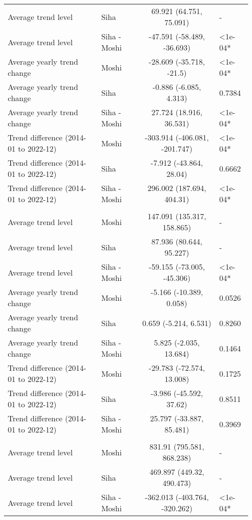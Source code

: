 \begin{longtable}{l|lcl}
Average trend level & Siha & 69.921 (64.751, 75.091) & - \\ 
Average trend level & Siha - Moshi & -47.591 (-58.489, -36.693) & <1e-04* \\ 
Average yearly trend change & Moshi & -28.609 (-35.718, -21.5) & <1e-04* \\ 
Average yearly trend change & Siha & -0.886 (-6.085, 4.313) & 0.7384 \\ 
Average yearly trend change & Siha - Moshi & 27.724 (18.916, 36.531) & <1e-04* \\ 
Trend difference (2014-01 to 2022-12) & Moshi & -303.914 (-406.081, -201.747) & <1e-04* \\ 
Trend difference (2014-01 to 2022-12) & Siha & -7.912 (-43.864, 28.04) & 0.6662 \\ 
Trend difference (2014-01 to 2022-12) & Siha - Moshi & 296.002 (187.694, 404.31) & <1e-04* \\ 
\midrule\addlinespace[2.5pt]
\multicolumn{4}{l}{Fractures} \\ 
\midrule\addlinespace[2.5pt]
Average trend level & Moshi & 147.091 (135.317, 158.865) & - \\ 
Average trend level & Siha & 87.936 (80.644, 95.227) & - \\ 
Average trend level & Siha - Moshi & -59.155 (-73.005, -45.306) & <1e-04* \\ 
Average yearly trend change & Moshi & -5.166 (-10.389, 0.058) & 0.0526 \\ 
Average yearly trend change & Siha & 0.659 (-5.214, 6.531) & 0.8260 \\ 
Average yearly trend change & Siha - Moshi & 5.825 (-2.035, 13.684) & 0.1464 \\ 
Trend difference (2014-01 to 2022-12) & Moshi & -29.783 (-72.574, 13.008) & 0.1725 \\ 
Trend difference (2014-01 to 2022-12) & Siha & -3.986 (-45.592, 37.62) & 0.8511 \\ 
Trend difference (2014-01 to 2022-12) & Siha - Moshi & 25.797 (-33.887, 85.481) & 0.3969 \\ 
\midrule\addlinespace[2.5pt]
\multicolumn{4}{l}{Hypertension} \\ 
\midrule\addlinespace[2.5pt]
Average trend level & Moshi & 831.91 (795.581, 868.238) & - \\ 
Average trend level & Siha & 469.897 (449.32, 490.473) & - \\ 
Average trend level & Siha - Moshi & -362.013 (-403.764, -320.262) & <1e-04* \\ 

\end{longtable}
